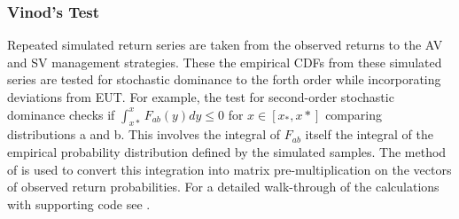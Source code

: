 \subsubsection{Vinod's Test}
Repeated simulated return series are taken from the observed returns to the AV and SV management strategies. These the empirical CDFs from these simulated series are tested for stochastic dominance to the forth order while incorporating deviations from EUT. For example, the test for second-order stochastic dominance checks if 
$\int_{x*}^{x} F_{ab}(y)dy \leq 0$ for $x \in [x_{*},x*]$ comparing distributions a and b. This involves the integral of $F_{ab}$ itself the integral of the empirical probability distribution defined by the simulated samples. The method of \citet{anderson_1996} is used to convert this integration into matrix pre-multiplication on the vectors of observed return probabilities. For a detailed walk-through of the calculations with supporting code see \citet{vinod_hands-intermediate_2008}. 
%		
%	
%		
%	
%		
%	
%		
